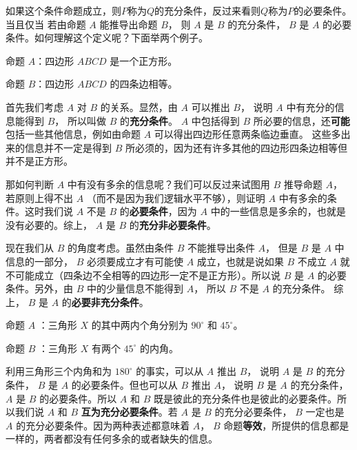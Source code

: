 如果这个条件命题成立，则$P$称为$Q$的充分条件，反过来看则$Q$称为$P$的必要条件。
当且仅当
若由命题 $A$ 能推导出命题 $B$， 则 $A$ 是 $B$ 的充分条件， $B$ 是 $A$ 的必要条件。如何理解这个定义呢？下面举两个例子。

\begin{example}{}
命题 $A$：四边形 $ABCD$ 是一个正方形。

命题 $B$：四边形 $ABCD$ 的四条边相等。

首先我们考虑 $A$ 对 $B$ 的关系。显然，由 $A$ 可以推出 $B$， 说明 $A$ 中有充分的信息能得到 $B$， 所以叫做 $B$ 的\textbf{充分条件}。 $A$ 中包括得到 $B$ 所必要的信息，还\textbf{可能}包括一些其他信息，例如由命题 $A$ 可以得出四边形任意两条临边垂直。 这些多出来的信息并不一定是得到 $B$ 所必须的，因为还有许多其他的四边形四条边相等但并不是正方形。

那如何判断 $A$ 中有没有多余的信息呢？我们可以反过来试图用 $B$ 推导命题 $A$， 若原则上得不出 $A$ （而不是因为我们逻辑水平不够），则证明 $A$ 中有多余的条件。这时我们说 $A$ 不是 $B$ 的\textbf{必要条件}，因为 $A$ 中的一些信息是多余的，也就是没有必要的。综上， $A$ 是 $B$ 的\textbf{充分非必要条件}。

现在我们从 $B$ 的角度考虑。虽然由条件 $B$ 不能推导出条件 $A$， 但是 $B$ 是 $A$ 中信息的一部分， $B$ 必须要成立才有可能使 $A$ 成立，也就是说如果 $B$ 不成立 $A$ 就不可能成立（四条边不全相等的四边形一定不是正方形）。所以说 $B$ 是 $A$ 的必要条件。另外，由 $B$ 中的少量信息不能得到 $A$， 所以 $B$ 不是 $A$ 的充分条件。 综上， $B$ 是 $A$ 的\textbf{必要非充分条件}。
\end{example}


\begin{example}{}
命题 $A$ ：三角形 $X$ 的其中两内个角分别为 $90^\circ$ 和 $45^\circ$。

命题 $B$ ：三角形 $X$ 有两个 $45^\circ$ 的内角。

利用三角形三个内角和为 $180^\circ$ 的事实，可以从 $A$ 推出 $B$， 说明 $A$ 是 $B$ 的充分条件， $B$ 是 $A$ 的必要条件。但也可以从 $B$ 推出 $A$， 说明 $B$ 是 $A$ 的充分条件， $A$ 是 $B$ 的必要条件。所以 $A$ 和 $B$ 既是彼此的充分条件也是彼此的必要条件。所以我们说 $A$ 和 $B$ \textbf{互为充分必要条件}。若 $A$ 是 $B$ 的充分必要条件， $B$ 一定也是 $A$ 的充分必要条件。因为两种表述都意味着 $A$，  $B$ 命题\textbf{等效}，所提供的信息都是一样的，两者都没有任何多余的或者缺失的信息。
\end{example}

